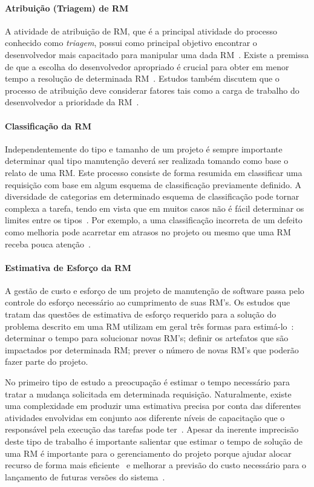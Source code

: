 \paragraph{Atribuição (Triagem) de RM} A atividade de atribuição de RM, que é a
principal atividade do processo conhecido como \textit{triagem}, possui como
principal objetivo encontrar o desenvolvedor mais capacitado para manipular uma
dada RM~\cite{cavalcanti2014challenges}. Existe a premissa de que a escolha do
desenvolvedor apropriado é crucial para obter em menor tempo a re\-so\-lu\-ção
de determinada RM~\cite{di2002approach}. Estudos também discutem que o processo
de atribuição deve considerar fatores tais como a carga de trabalho do
desenvolvedor a prioridade da RM~\cite{aljarah2011selecting}.

\paragraph{Classificação da RM} Independentemente do tipo e tamanho de um
projeto é sempre importante determinar qual tipo manutenção deverá ser realizada
tomando como base o relato de uma RM\@.  Este processo consiste de forma
resumida em classificar uma requisição com base em algum esquema de
classificação previamente definido. A diversidade de categorias em determinado
esquema de classificação pode tornar complexa a tarefa, tendo em vista que em
muitos casos não é fácil determinar os limites entre os
tipos~\cite{antoniol2008bug}. Por exemplo, a uma classificação incorreta de um
defeito como melhoria pode acarretar em atrasos no projeto ou mesmo que uma RM
receba pouca atenção~\cite{cavalcanti2014challenges}.

\paragraph{Estimativa de Esforço da RM} A gestão de custo e esforço de um
projeto de manutenção de software passa pelo controle do esforço necessário ao
cumprimento de suas RM's. Os estudos que tratam das questões de estimativa de
esforço requerido para a solução do problema descrito em uma RM utilizam em
geral três formas para estimá-lo~\cite{cavalcanti2014challenges}: determinar o
tempo para solucionar novas RM's; definir os artefatos que são impactados por
determinada RM\@; prever o número de novas RM's que poderão fazer parte do
projeto.

No primeiro tipo de estudo a preocupação é estimar o tempo necessário para
tratar a mudança solicitada em determinada requisição. Naturalmente, existe uma
complexidade em produzir uma estimativa precisa por conta das diferentes
atividades envolvidas em conjunto aos diferente níveis de capacitação que o
responsável pela execução das tarefas pode ter~\cite{xia2015automatic}.  Apesar
da inerente imprecisão deste tipo de trabalho é importante salientar que estimar
o tempo de solução de uma RM é importante para o gerenciamento do projeto porque
ajudar alocar recurso de forma mais
eficiente~\cite{Bhattacharya:2011:BTP:1985441.1985472} e melhorar a previsão do
custo necessário para o lançamento de futuras versões do
sistema~\cite{Vijayakumar2014}.

